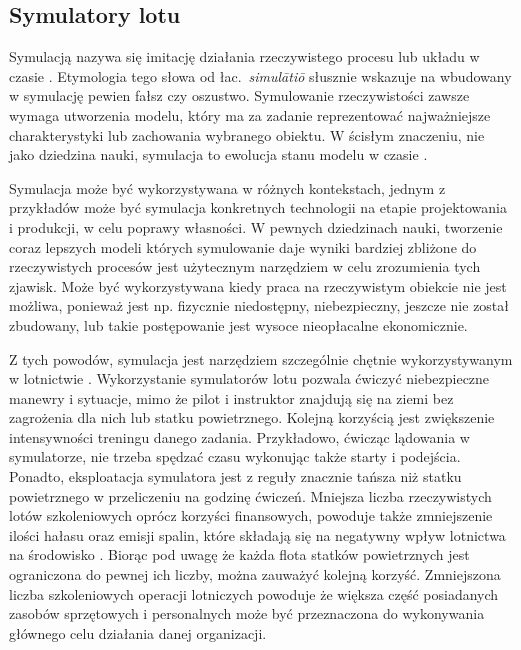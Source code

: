 \subsection{Symulatory lotu}
Symulacją nazywa się imitację działania rzeczywistego procesu lub układu w czasie \cite{banks2010}. Etymologia tego słowa od łac.~\emph{simulātiō} słusznie wskazuje na wbudowany w symulację pewien fałsz czy oszustwo. Symulowanie rzeczywistości zawsze wymaga utworzenia modelu, który ma za zadanie reprezentować najważniejsze charakterystyki lub zachowania wybranego obiektu. W ścisłym znaczeniu, nie jako dziedzina nauki, symulacja to ewolucja stanu modelu w czasie \cite{banks2010}.

Symulacja może być wykorzystywana w różnych kontekstach, jednym z przykładów może być symulacja konkretnych technologii na etapie projektowania i produkcji, w celu poprawy własności. W pewnych dziedzinach nauki, tworzenie coraz lepszych modeli których symulowanie daje wyniki bardziej zbliżone do rzeczywistych procesów jest użytecznym narzędziem w celu zrozumienia tych zjawisk. Może być wykorzystywana kiedy praca na rzeczywistym obiekcie nie jest możliwa, ponieważ jest np. fizycznie niedostępny, niebezpieczny, jeszcze nie został zbudowany, lub takie postępowanie jest wysoce nieopłacalne ekonomicznie.

Z tych powodów, symulacja jest narzędziem szczególnie chętnie wykorzystywanym w lotnictwie \cite{neal2020}. Wykorzystanie symulatorów lotu pozwala ćwiczyć niebezpieczne manewry i sytuacje, mimo że pilot i instruktor znajdują się na ziemi bez zagrożenia dla nich lub statku powietrznego. Kolejną korzyścią jest zwiększenie intensywności treningu danego zadania. Przykładowo, ćwicząc lądowania w symulatorze, nie trzeba spędzać czasu wykonując także starty i podejścia. Ponadto, eksploatacja symulatora jest z reguły znacznie tańsza niż statku powietrznego w przeliczeniu na godzinę ćwiczeń. Mniejsza liczba rzeczywistych lotów szkoleniowych oprócz korzyści finansowych, powoduje także zmniejszenie ilości hałasu oraz emisji spalin, które składają się na negatywny wpływ lotnictwa na środowisko \cite{eaer2019}. Biorąc pod uwagę że każda flota statków powietrznych jest ograniczona do pewnej ich liczby, można zauważyć kolejną korzyść. Zmniejszona liczba szkoleniowych operacji lotniczych powoduje że większa część posiadanych zasobów sprzętowych i personalnych może być przeznaczona do wykonywania głównego celu działania danej organizacji.

